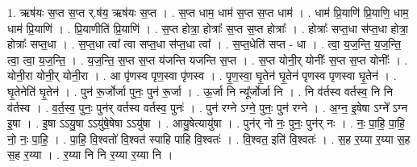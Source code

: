 \documentclass[17pt]{extarticle}
\begin{document}
1. ऋष॑यः स॒प्त स॒प्त र्.ष॑य॒ ऋष॑यः स॒प्त । . स॒प्त धाम॒ धाम॑ स॒प्त स॒प्त धाम॑ । . धाम॑ प्रि॒याणि॑ प्रि॒याणि॒ धाम॒ धाम॑ प्रि॒याणि॑ । . प्रि॒याणीति॑ प्रि॒याणि॑ । . स॒प्त होत्रा॒ होत्राः᳚ स॒प्त स॒प्त होत्राः᳚ । . होत्राः᳚ सप्त॒धा स॑प्त॒धा होत्रा॒ होत्राः᳚ सप्त॒धा । . स॒प्त॒धा त्वा᳚ त्वा सप्त॒धा स॑प्त॒धा त्वा᳚ । . स॒प्त॒धेति॑ सप्त - धा । . त्वा॒ य॒ज॒न्ति॒ य॒ज॒न्ति॒ त्वा॒ त्वा॒ य॒ज॒न्ति॒ । . य॒ज॒न्ति॒ स॒प्त स॒प्त य॑जन्ति यजन्ति स॒प्त । . स॒प्त योनी॒र् योनीः᳚ स॒प्त स॒प्त योनीः᳚ । . योनी॒रा योनी॒र् योनी॒रा । . आ पृ॑णस्व पृण॒स्वा पृ॑णस्व । . पृ॒ण॒स्वा॒ घृ॒तेन॑ घृ॒तेन॑ पृणस्व पृणस्वा घृ॒तेन॑ । . घृ॒तेनेति॑ घृ॒तेन॑ । . पुन॑ रू॒र्जोर्जा पुनः॒ पुन॑ रू॒र्जा । . ऊ॒र्जा नि न्यू᳚र्जोर्जा नि । . नि व॑र्तस्व वर्तस्व॒ नि नि व॑र्तस्व । . व॒र्त॒स्व॒ पुनः॒ पुन॑र् वर्तस्व वर्तस्व॒ पुनः॑ । . पुन॑ रग्ने ऽग्ने॒ पुनः॒ पुन॑ रग्ने । . अ॒ग्न॒ इ॒षेषा ऽग्ने᳚ ऽग्न इ॒षा । . इ॒षा ऽऽयु॒षा ऽऽयु॑षे॒षेषा ऽऽयु॑षा । . आयु॒षेत्यायु॑षा । . पुन॑र् नो नः॒ पुनः॒ पुन॑र् नः । . नः॒ पा॒हि॒ पा॒हि॒ नो॒ नः॒ पा॒हि॒ । . पा॒हि॒ वि॒श्वतो॑ वि॒श्वत॑ स्पाहि पाहि वि॒श्वतः॑ । . वि॒श्वत॒ इति॑ वि॒श्वतः॑ । . स॒ह र॒य्या र॒य्या स॒ह स॒ह र॒य्या । . र॒य्या नि नि र॒य्या र॒य्या नि । \newline
\end{document}
